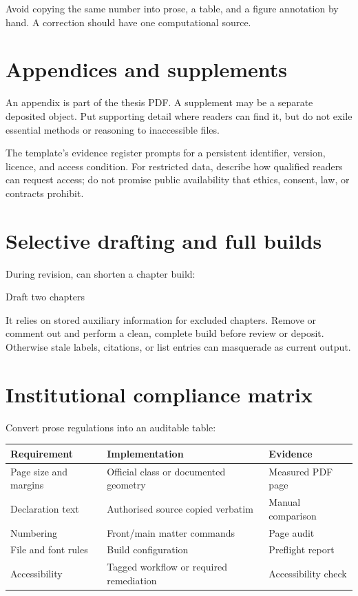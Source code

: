 Avoid copying the same number into prose, a table, and a figure annotation by
hand. A correction should have one computational source.

\section{Appendices and supplements}

An appendix is part of the thesis PDF. A supplement may be a separate deposited
object. Put supporting detail where readers can find it, but do not exile
essential methods or reasoning to inaccessible files.

The template's evidence register prompts for a persistent identifier, version,
licence, and access condition. For restricted data, describe how qualified
readers can request access; do not promise public availability that ethics,
consent, law, or contracts prohibit.

\section{Selective drafting and full builds}

During revision,  can shorten a chapter build:

\begin{latexcode}{Draft two chapters}

\end{latexcode}

It relies on stored auxiliary information for excluded chapters. Remove or
comment out  and perform a clean, complete build before review
or deposit. Otherwise stale labels, citations, or list entries can masquerade
as current output.

\section{Institutional compliance matrix}

Convert prose regulations into an auditable table:

\begin{center}
\begin{tabularx}{\textwidth}{@{}p{}Xp{}@{}}
  \toprule
  Requirement & Implementation & Evidence \\
  \midrule
  Page size and margins & Official class or documented geometry & Measured PDF page \\
  Declaration text & Authorised source copied verbatim & Manual comparison \\
  Numbering & Front/main matter commands & Page audit \\
  File and font rules & Build configuration & Preflight report \\
  Accessibility & Tagged workflow or required remediation & Accessibility check \\
  \bottomrule
\end{tabularx}
\end{center}

